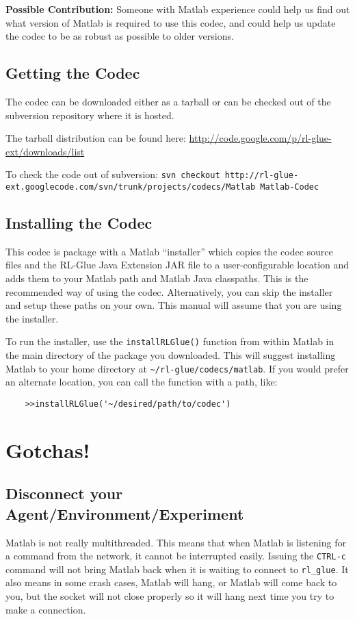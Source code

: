 \documentclass[11pt]{article}
\begin{document}
\textbf{Possible Contribution: }Someone with Matlab experience could help us find out what version of Matlab is required to use this codec, and could help us update the codec
to be as robust as possible to older versions.

\subsection{Getting the Codec}
The codec can be downloaded either as a tarball or can be checked out of the subversion repository where it is hosted.

The tarball distribution can be found here:\newline
\url{http://code.google.com/p/rl-glue-ext/downloads/list}


To check the code out of subversion:\newline
\small \texttt{svn checkout http://rl-glue-ext.googlecode.com/svn/trunk/projects/codecs/Matlab Matlab-Codec} \normalsize

\subsection{Installing the Codec}
This codec is package with a Matlab ``installer'' which copies the codec source files and the RL-Glue Java Extension JAR file to a user-configurable location and adds them to your Matlab path and Matlab Java classpaths.  This is the recommended way of using the codec.  Alternatively, you can skip the installer and setup these paths on your own.   This manual will assume that you are using the installer.

To run the installer, use the \texttt{installRLGlue()} function from within Matlab in the main directory of the package you downloaded.  This will suggest installing Matlab to your home directory at \texttt{\~{}/rl-glue/codecs/matlab}.  If you would prefer an alternate location, you can call the function with a path, like:
\begin{verbatim}
	>>installRLGlue('~/desired/path/to/codec')
\end{verbatim}


\section{Gotchas!}
\subsection{Disconnect your Agent/Environment/Experiment}
Matlab is not really multithreaded.  This means that when Matlab is listening for a command from the network, it cannot be interrupted easily. Issuing the  \texttt{CTRL-c} command will not bring Matlab back when it is waiting to connect to \texttt{rl\_glue}.  It also means in some crash cases, Matlab will hang, or Matlab will come back to you, but the socket will not close properly so it will hang next time you try to make a connection.
\end{document}
